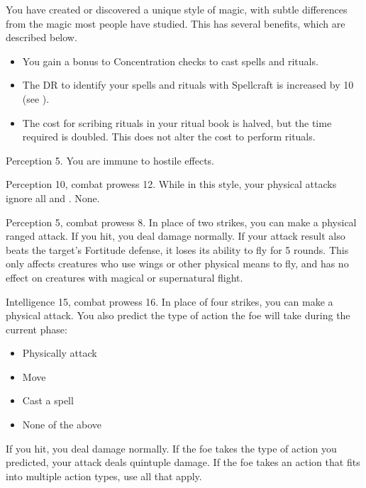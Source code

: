 \featben You have created or discovered a unique style of magic, with subtle differences from the magic most people have studied.
This has several benefits, which are described below.
\begin{itemize}
    \item You gain a  bonus to Concentration checks to cast spells and rituals.
    \item The DR to identify your spells and rituals with Spellcraft is increased by 10 (see ).
    \item The cost for scribing rituals in your ritual book is halved, but the time required is doubled.
        This does not alter the cost to perform rituals.
\end{itemize}

\featpre Perception 5.
\featben You are immune to hostile  effects.

\featpres Perception 10, combat prowess 12.
\featben While in this style, your physical attacks ignore all  and .
\stylereq None.

\featpres Perception 5, combat prowess 8.
\featben In place of two strikes, you can make a physical ranged attack.
If you hit, you deal damage normally.
If your attack result also beats the target's Fortitude defense, it loses its ability to fly for 5 rounds.
This only affects creatures who use wings or other physical means to fly, and has no effect on creatures with magical or supernatural flight.

\featpres Intelligence 15, combat prowess 16.
\featben In place of four strikes, you can make a physical attack.
You also predict the type of action the foe will take during the current phase:
\begin{itemize}
    \item Physically attack
    \item Move
    \item Cast a spell
    \item None of the above
\end{itemize}
If you hit, you deal damage normally.
If the foe takes the type of action you predicted, your attack deals quintuple damage.
If the foe takes an action that fits into multiple action types, use all that apply.

